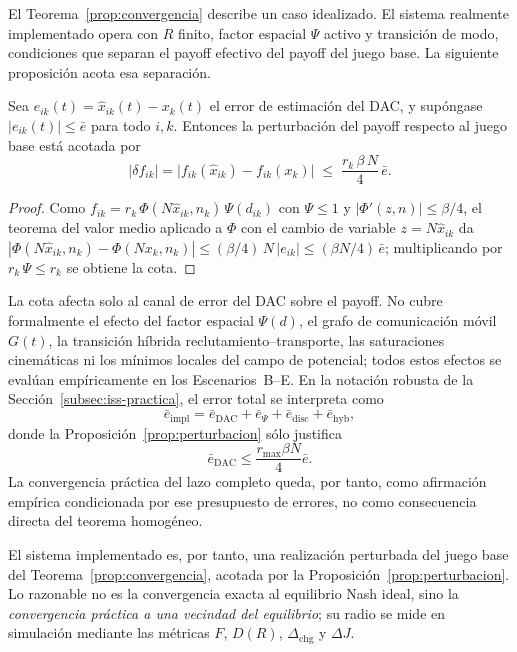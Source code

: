 El Teorema~\ref{prop:convergencia} describe un caso idealizado. El sistema
realmente implementado opera con $R$ finito, factor espacial $\Psi$ activo y
transición de modo, condiciones que separan el payoff efectivo del payoff del juego
base. La siguiente proposición acota esa separación.

\begin{proposicion}
\label{prop:perturbacion}
Sea $e_{ik}(t) = \hat{x}_{ik}(t) - x_k(t)$ el error de estimación del DAC, y
supóngase $|e_{ik}(t)| \leq \bar{e}$ para todo $i,k$. Entonces la perturbación del
payoff respecto al juego base está acotada por
\[
  |\delta f_{ik}| = \bigl|f_{ik}(\hat{x}_{ik}) - f_{ik}(x_k)\bigr|
    \;\leq\; \frac{r_k\,\beta\,N}{4}\,\bar{e}.
\]
\end{proposicion}
\begin{proof}
Como $f_{ik} = r_k\,\Phi(N\hat{x}_{ik},n_k)\,\Psi(d_{ik})$ con $\Psi \leq 1$ y
$|\Phi'(z,n)| \leq \beta/4$, el teorema del valor medio aplicado a $\Phi$ con el
cambio de variable $z = N\hat{x}_{ik}$ da
$|\Phi(N\hat{x}_{ik},n_k) - \Phi(Nx_k,n_k)| \leq (\beta/4)\,N\,|e_{ik}|
\leq (\beta N/4)\,\bar{e}$; multiplicando por $r_k\,\Psi \leq r_k$ se obtiene la cota.
\end{proof}

La cota afecta solo al canal de error del DAC sobre el payoff. No cubre
formalmente el efecto del factor espacial $\Psi(d)$, el grafo de comunicación móvil
$G(t)$, la transición híbrida reclutamiento--transporte, las saturaciones cinemáticas
ni los mínimos locales del campo de potencial; todos estos efectos se evalúan
empíricamente en los Escenarios~B--E.
En la notación robusta de la Sección~\ref{subsec:iss-practica}, el error total se interpreta
como
\[
  \bar e_{\mathrm{impl}}
  =
  \bar e_{\mathrm{DAC}}
  +
  \bar e_{\Psi}
  +
  \bar e_{\mathrm{disc}}
  +
  \bar e_{\mathrm{hyb}},
\]
donde la Proposición~\ref{prop:perturbacion} sólo justifica
\[
  \bar e_{\mathrm{DAC}}
  \le
  \frac{r_{\max}\beta N}{4}\bar e.
\]
La convergencia práctica del lazo completo queda, por tanto, como afirmación empírica
condicionada por ese presupuesto de errores, no como consecuencia directa del teorema
homogéneo.

El sistema implementado es, por tanto, una realización perturbada del juego base del
Teorema~\ref{prop:convergencia}, acotada por la Proposición~\ref{prop:perturbacion}. Lo
razonable no es la convergencia exacta al equilibrio Nash ideal, sino la
\emph{convergencia práctica a una vecindad del equilibrio}; su radio se mide en
simulación mediante las métricas $F$, $D(R)$, $\Delta_{\mathrm{chg}}$ y $\Delta J$.

